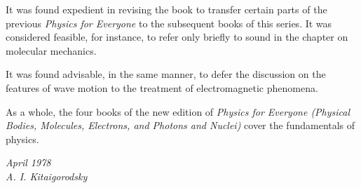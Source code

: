 It was found expedient in revising the book to transfer certain parts of the previous \emph{Physics for Everyone} to the subsequent books of this series. It was considered fea­sible, for instance, to refer only briefly to sound in the chapter on molecular mechanics.

It was found advisable, in the same manner, to defer the discussion on the features of wave motion to the treatment of electromagnetic phenomena.

As a whole, the four books of the new edition of \emph{Physics for Everyone (Physical Bodies, Molecules, Electrons, and Photons and Nuclei)} cover the fundamentals of physics.


\begin{flushright}
 \emph{April 1978\\
A. I. Kitaigorodsky}
\end{flushright}

\cleardoublepage

